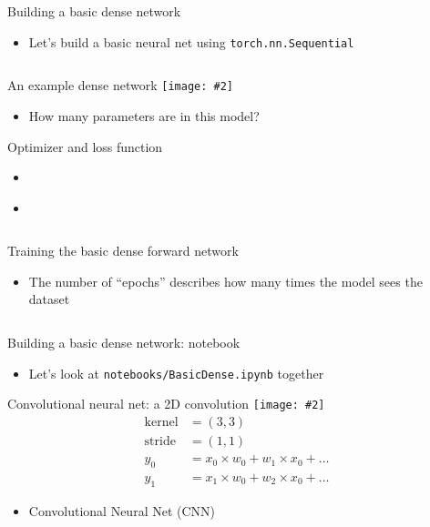 \documentclass[hyperref={pdfpagelabels=false},12pt]{beamer}
\newcommand{\ig}[2]{\texttt{[image: \#2]}}
\newcommand{\code}[2]{\texttt{#2}}
\newcommand{\python}[1]{\code{python}{#1}}
\newcommand{\namedUrl}[2]{\href{#1}{\color{blue}{#2}}}
\newcommand{\pygment}[3]{\inputminted[bgcolor=lightgray,linenos,fontsize=#1]{#2}{#3}}
\begin{document}
\begin{frame}{Building a basic dense network}
  \begin{itemize}
    \item Let's build a basic neural net using \python{torch.nn.Sequential}
  \end{itemize}
  \pygment{\scriptsize}{python}{code/basic-dense-model.py}
\end{frame}

\begin{frame}{An example dense network}
  \ig{1.0}{figures/dense-neural-net.png}
  \begin{itemize}
    \item How many parameters are in this model?
  \end{itemize}
\end{frame}

\begin{frame}{Optimizer and loss function}
  \begin{itemize}
    \item \namedUrl{https://arxiv.org/abs/1412.6980}{Adam Optimizer}
    \item \namedUrl{https://pytorch.org/docs/stable/nn.html\#crossentropyloss}{Cross Entropy Loss}
  \end{itemize}
  \pygment{\scriptsize}{python}{code/optimizer-loss-fn.py}
\end{frame}

\begin{frame}{Training the basic dense forward network}
  \begin{itemize}
    \item The number of ``epochs'' describes how many times the model sees the dataset
  \end{itemize}
  \pygment{\scriptsize}{python}{code/training-dense-model.py}
\end{frame}

\begin{frame}{Building a basic dense network: notebook}
  \begin{itemize}
    \item Let's look at \texttt{notebooks/BasicDense.ipynb} together
  \end{itemize}
\end{frame}

\begin{frame}{Convolutional neural net: a 2D convolution}
  \centering
  \ig{0.75}{figures/convolution.png}
  \begin{align*}
    \mathrm{kernel} &= (3, 3) \\
    \mathrm{stride} &= (1, 1) \\
    y_0 &= x_0 \times w_0 + w_1 \times x_0 + \dots \\
    y_1 &= x_1 \times w_0 + w_2 \times x_0 + \dots
  \end{align*}
  \begin{itemize}
    \item Convolutional Neural Net (CNN)
  \end{itemize}
\end{frame}
\end{document}
